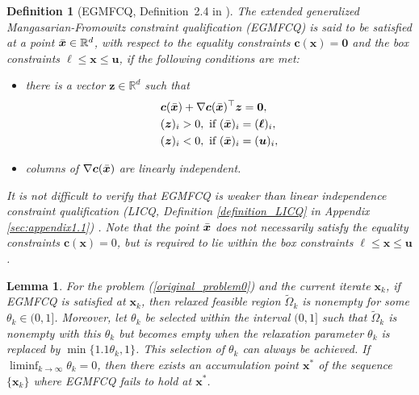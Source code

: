 \documentclass[aos]{imsart}
\numberwithin{equation}{section}
\theoremstyle{plain}
\newtheorem{definition}{Definition}
\newtheorem{lemma}{Lemma}
\begin{document}
\begin{definition}
    [EGMFCQ, Definition~2.4 in \cite{xu2015smoothing}] 
    \label{def_MFCQ}
    The extended generalized Mangasarian-Fromowitz constraint qualification (EGMFCQ) is said to be satisfied at a point $\Bar{\bm{x}} \in \mathbb{R}^{d}$, with respect to the equality constraints $\bm{c}(\bm{x}) = \bm{0}$ and the box constraints $\bm{\ell} \leq \bm{x} \leq \bm{u}$, if the following conditions are met:
    \begin{itemize}
        \item there is a vector $\bm{z} \in \mathbb{R}^{d}$ such that
        \begin{equation}
        \label{MFCQ_z}
            \begin{split}
                & \bm{c}(\Bar{\bm{x}}) + \nabla \bm{c}(\Bar{\bm{x}})^{\top} \bm{z} = \bm{0}, \\
                & (\bm{z})_i >0,~\text{if}~(\Bar{\bm{x}})_{i} = (\bm{\ell})_i,\\
                & (\bm{z})_i < 0,~\text{if}~(\Bar{\bm{x}})_{i} = (\bm{u})_i,
            \end{split}
        \end{equation}

        \item columns of $\nabla \bm{c}(\Bar{\bm{x}})$ are linearly independent. 
    \end{itemize}
    It is not difficult to verify that EGMFCQ is weaker than linear independence constraint qualification (LICQ, Definition \ref{definition_LICQ} in Appendix \ref{sec:appendix1.1}) \cite[Definition~12.4]{jorge2006numerical}. 
    Note that the point $\Bar{\bm{x}}$ does not necessarily satisfy the equality constraints $\bm{c}(\bm{x}) = 0$, but is required to lie within the box constraints $\bm{\ell} \leq \bm{x} \leq \bm{u}$. 
\end{definition}




\begin{lemma}
\label{prop_thetak_to_0}
    For the problem (\ref{original_problem0}) and the current iterate $\bm{x}_k$, if EGMFCQ is satisfied at $\bm{x}_k$, then relaxed feasible region $\widetilde{\Omega}_k$ is nonempty for some $\theta_k \in (0,1]$. Moreover, let $\theta_k$ be selected within the interval $(0,1]$ such that $\widetilde{\Omega}_k$ is nonempty with this $\theta_k$ but becomes empty when the relaxation parameter $\theta_k$ is replaced by $\min\{1.1\theta_k,1\}$. This selection of $\theta_k$ can always be achieved. If $\mathop{\lim \inf}_{k \to \infty} \theta_k = 0$, then there exists an accumulation point $\bm{x}^{*}$ of the sequence $\{\bm{x}_k\}$ where EGMFCQ fails to hold at $\bm{x}^{*}$.
\end{lemma}
\end{document}

